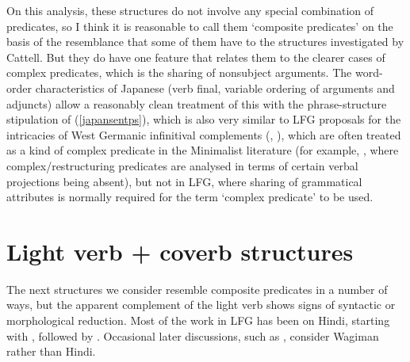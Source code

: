 \documentclass[output=paper,hidelinks]{langscibook}
\begin{document}
On this analysis, these structures do not involve any special combination of predicates,
so I think it is reasonable to call them `composite predicates' on the basis of the
resemblance that some of them have to the structures investigated by Cattell.  But they
do have one feature that relates them to the clearer cases of complex predicates,
which is the sharing of nonsubject arguments.  The word-order characteristics of
Japanese (verb final, variable ordering of arguments and adjuncts) allow a reasonably
clean treatment of this with the phrase-structure stipulation of (\ref{japansentps}),
which is also very similar to LFG proposals for the intricacies of West Germanic infinitival
complements (\cite{zaenen-kaplan1995}, \cite{KaplanZaenen2003}), which are often treated
as a kind of complex predicate in the Minimalist literature (for example, \cite{Wurmbrand2017},
where complex/restructuring predicates are analysed in terms of certain verbal projections
being absent), but not in LFG, where sharing of grammatical attributes is normally
required for the term `complex predicate' to be used.

\section{Light verb + coverb structures}
The next structures we consider resemble composite predicates in a number
of ways, but the apparent complement of the light verb shows signs of syntactic
or morphological reduction.  Most of the work in LFG has been on Hindi, starting with
\citet{MohananT1994}, followed by \citet{MohananT1997}.  Occasional later discussions, such
as \citet[34--37]{AndrewsManning1999}, consider Wagiman rather than Hindi.
\end{document}
